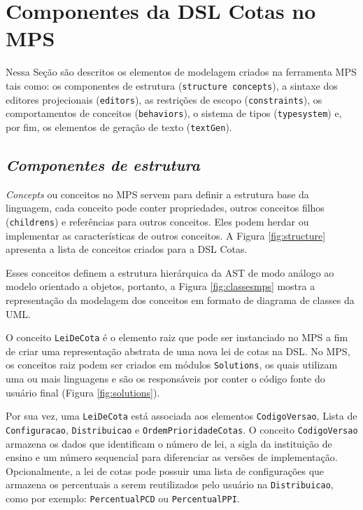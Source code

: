 \section{Componentes da DSL Cotas no MPS}
\label{sec:mps}

Nessa Seção são descritos os elementos de modelagem criados na ferramenta \gls{MPS} tais como: os componentes de estrutura (\texttt{structure concepts}), a sintaxe dos editores projecionais (\texttt{editors}), as restrições de escopo (\texttt{constraints}), os comportamentos de conceitos (\texttt{behaviors}), o sistema de tipos (\texttt{typesystem}) e, por fim, os elementos de geração de texto (\texttt{textGen}).

\subsection{\textit{Componentes de estrutura}}
\label{sub:sec:estrutura}

\textit{Concepts} ou conceitos no \gls{MPS} servem para definir a estrutura base da linguagem, cada conceito pode conter propriedades, outros conceitos filhos (\texttt{childrens}) e referências para outros conceitos. Eles podem herdar ou implementar as características de outros conceitos. A Figura \ref{fig:structure} apresenta a lista de conceitos criados para a DSL Cotas.




\newpage
Esses conceitos definem a estrutura hierárquica da \gls{AST} de modo análogo ao modelo orientado a objetos, portanto, a Figura \ref{fig:classesmps} mostra a representação da modelagem dos conceitos em formato de diagrama de classes da \gls{UML}.




\newpage
O conceito \texttt{LeiDeCota} é o elemento raiz  que pode ser instanciado no \gls{MPS} a fim de criar uma representação abstrata de uma nova lei de cotas na DSL. No \gls{MPS}, os conceitos raiz podem ser criados em módulos \texttt{Solutions}, os quais utilizam uma ou mais linguagens e são os responsáveis por conter o código fonte do usuário final (Figura \ref{fig:solutions}).




Por sua vez, uma \texttt{LeiDeCota} está associada aos elementos \texttt{CodigoVersao}, Lista de \texttt{Configur}\newline\texttt{acao}, \texttt{Distribuicao} e \texttt{OrdemPrioridadeCotas}. O conceito \texttt{CodigoVersao} armazena os dados que identificam o número de lei, a sigla da instituição de ensino e um número sequencial para diferenciar as versões de implementação. Opcionalmente, a lei de cotas pode possuir uma lista de configurações que armazena os percentuais a serem reutilizados pelo usuário na \texttt{Distribuicao}, como por exemplo: \texttt{PercentualPCD} ou \texttt{PercentualPPI}. 

